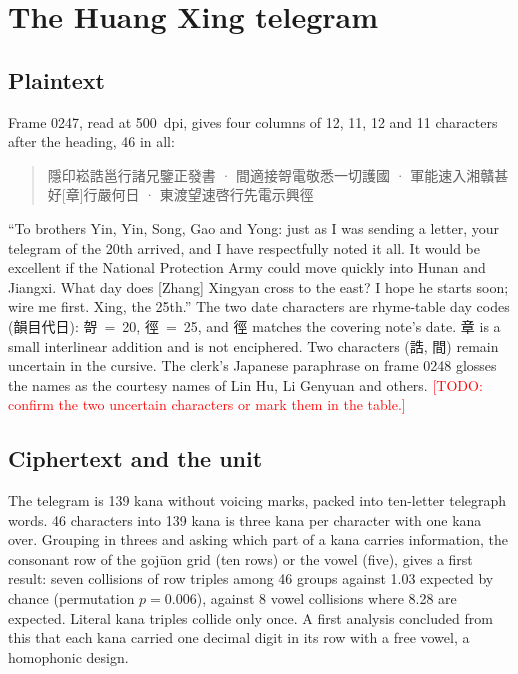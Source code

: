 \documentclass[11pt]{article}
\newcommand{\todo}[1]{\textcolor{red}{[TODO: #1]}}
\begin{document}
\section{The Huang Xing telegram}\label{sec:huang}

\subsection{Plaintext}

Frame 0247, read at 500~dpi, gives four columns of 12, 11, 12 and 11 characters after the heading, 46 in all:

\begin{quote}
隱印崧誥邕行諸兄鑒正發書 · 間適接哿電敬悉一切護國 · 軍能速入湘贛甚好[章]行嚴何日 · 東渡望速啓行先電示興徑
\end{quote}

``To brothers Yin, Yin, Song, Gao and Yong: just as I was sending a letter, your telegram of the 20th arrived, and I have respectfully noted it all. It would be excellent if the National Protection Army could move quickly into Hunan and Jiangxi. What day does [Zhang] Xingyan cross to the east? I hope he starts soon; wire me first. Xing, the 25th.'' The two date characters are rhyme-table day codes (韻目代日): 哿~=~20, 徑~=~25, and 徑 matches the covering note's date. 章 is a small interlinear addition and is not enciphered. Two characters (誥, 間) remain uncertain in the cursive. The clerk's Japanese paraphrase on frame 0248 glosses the names as the courtesy names of Lin Hu, Li Genyuan and others. \todo{confirm the two uncertain characters or mark them in the table.}

\subsection{Ciphertext and the unit}

The telegram is 139 kana without voicing marks, packed into ten-letter telegraph words. 46 characters into 139 kana is three kana per character with one kana over. Grouping in threes and asking which part of a kana carries information, the consonant row of the goj\={u}on grid (ten rows) or the vowel (five), gives a first result: seven collisions of row triples among 46 groups against 1.03 expected by chance (permutation $p = 0.006$), against 8 vowel collisions where 8.28 are expected. Literal kana triples collide only once. A first analysis concluded from this that each kana carried one decimal digit in its row with a free vowel, a homophonic design.
\end{document}
